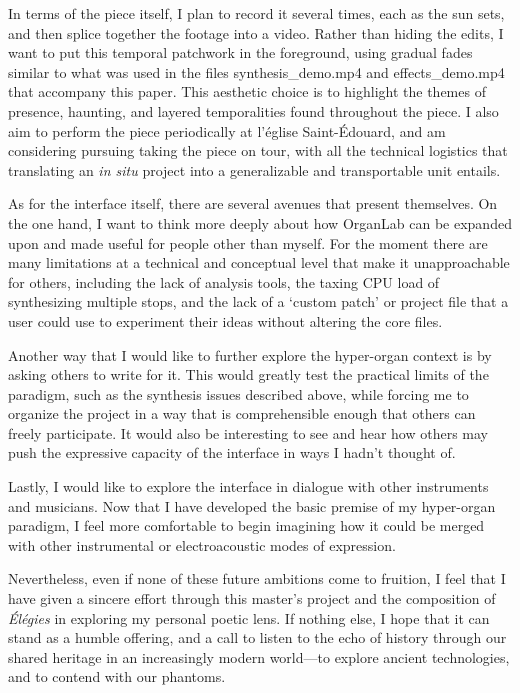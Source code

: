 \documentclass[12pt,twoside,maitrise]{dms_ks}
\theoremstyle{definition}
\begin{document}
{{In terms of the piece itself, I plan to record it several times, each as the sun sets, and then splice together the footage into a video.
Rather than hiding the edits, I want to put this temporal patchwork in the foreground, using gradual fades similar to what was used in the files synthesis\_demo.mp4 and effects\_demo.mp4 that accompany this paper.
This aesthetic choice is to highlight the themes of presence, haunting, and layered temporalities found throughout the piece.
I also aim to perform the piece periodically at l'église Saint-Édouard, and am considering pursuing taking the piece on tour, with all the technical logistics that translating an \textit{in situ} project into a generalizable and transportable unit entails.

As for the interface itself, there are several avenues that present themselves. 
On the one hand, I want to think more deeply about how OrganLab can be expanded upon and made useful for people other than myself. 
For the moment there are many limitations at a technical and conceptual level that make it unapproachable for others, including the lack of analysis tools, the taxing CPU load of synthesizing multiple stops, and the lack of a `custom patch' or project file that a user could use to experiment their ideas without altering the core files. 

Another way that I would like to further explore the hyper-organ context is by asking others to write for it. 
This would greatly test the practical limits of the paradigm, such as the synthesis issues described above, while forcing me to organize the project in a way that is comprehensible enough that others can freely participate. 
It would also be interesting to see and hear how others may push the expressive capacity of the interface in ways I hadn't thought of.

Lastly, I would like to explore the interface in dialogue with other instruments and musicians. 
Now that I have developed the basic premise of my hyper-organ paradigm, I feel more comfortable to begin imagining how it could be merged with other instrumental or electroacoustic modes of expression.

Nevertheless, even if none of these future ambitions come to fruition, I feel that I have given a sincere effort through this master's project and the composition of \textit{Élégies} in exploring my personal poetic lens. 
If nothing else, I hope that it can stand as a humble offering, and a call to listen to the echo of history through our shared heritage in an increasingly modern world---to explore ancient technologies, and to contend with our phantoms.

}}
\end{document}
